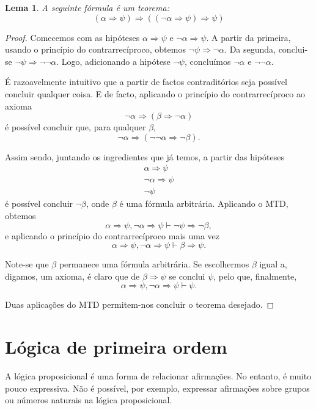 \documentclass{report}
\newtheorem{lema}{Lema}
\theoremstyle{definition}
\theoremstyle{remark}
\newcommand{\imply}{\mathbin{\Rightarrow}}
\begin{document}
	\begin{lema}\label{lema:aornota}
	A seguinte fórmula é um teorema:
	\[(\alpha \imply \psi) \imply ((\neg \alpha \imply \psi) \imply \psi)\]
	\end{lema}
	
	\begin{proof}
	Comecemos com as hipóteses $\alpha \imply \psi$ e $\neg \alpha \imply \psi$. A partir da primeira, usando o princípio do contrarrecíproco, obtemos $\neg \psi \imply \neg \alpha$. Da segunda, conclui-se $\neg \psi \imply \neg \neg \alpha$. Logo, adicionando a hipótese $\neg \psi$, concluímos $\neg \alpha$ e $\neg\neg\alpha$.
	
	É razoavelmente intuitivo que a partir de factos contraditórios seja possível concluir qualquer coisa. E de facto, aplicando o princípio do contrarrecíproco ao axioma
	\[\neg \alpha \imply (\beta \imply \neg \alpha)\]
	é possível concluir que, para qualquer $\beta$,
	\[\neg \alpha \imply (\neg \neg \alpha \imply \neg \beta).\]
	
	Assim sendo, juntando os ingredientes que já temos, a partir das hipóteses
	\begin{gather*}
	\alpha \imply \psi\\
	\neg \alpha \imply \psi\\
	\neg \psi
	\end{gather*}
	é possível concluir $\neg \beta$, onde $\beta$ é uma fórmula arbitrária. Aplicando o MTD, obtemos
	\[\alpha \imply \psi, \neg \alpha \imply \psi \vdash \neg \psi \imply \neg \beta,\]
	e aplicando o princípio do contrarrecíproco mais uma vez
	\[\alpha \imply \psi, \neg \alpha \imply \psi \vdash \beta \imply \psi.\]
	
	Note-se que $\beta$ permanece uma fórmula arbitrária. Se escolhermos $\beta$ igual a, digamos, um axioma, é claro que de $\beta \imply \psi$ se conclui $\psi$, pelo que, finalmente,
	\[\alpha \imply \psi, \neg \alpha \imply \psi \vdash \psi.\]
	
	Duas aplicações do MTD permitem-nos concluir o teorema desejado.
	\end{proof}
	
	
	\chapter{Lógica de primeira ordem}
	
	A lógica proposicional é uma forma de relacionar afirmações. No entanto, é muito pouco expressiva. Não é possível, por exemplo, expressar afirmações sobre grupos ou números naturais na lógica proposicional.
	
\end{document}
